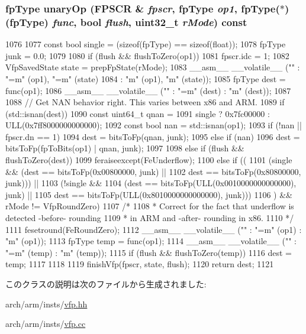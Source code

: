 \hypertarget{classArmISA_1_1FpOp_a0129111f707a89446f721aafe6b11748}{
\subsubsection[{unaryOp}]{\setlength{\rightskip}{0pt plus 5cm}fpType unaryOp (FPSCR \& {\em fpscr}, \/  fpType {\em op1}, \/  fpType($\ast$)(fpType) {\em func}, \/  bool {\em flush}, \/  {\bf uint32\_\-t} {\em rMode}) const}}
\label{classArmISA_1_1FpOp_a0129111f707a89446f721aafe6b11748}



\begin{DoxyCode}
1076 {
1077     const bool single = (sizeof(fpType) == sizeof(float));
1078     fpType junk = 0.0;
1079 
1080     if (flush && flushToZero(op1))
1081         fpscr.idc = 1;
1082     VfpSavedState state = prepFpState(rMode);
1083     __asm__ __volatile__ ("" : "=m" (op1), "=m" (state)
1084                              : "m" (op1), "m" (state));
1085     fpType dest = func(op1);
1086     __asm__ __volatile__ ("" : "=m" (dest) : "m" (dest));
1087 
1088     // Get NAN behavior right. This varies between x86 and ARM.
1089     if (std::isnan(dest)) {
1090         const uint64_t qnan =
1091             single ? 0x7fc00000 : ULL(0x7ff8000000000000);
1092         const bool nan = std::isnan(op1);
1093         if (!nan || fpscr.dn == 1) {
1094             dest = bitsToFp(qnan, junk);
1095         } else if (nan) {
1096             dest = bitsToFp(fpToBits(op1) | qnan, junk);
1097         }
1098     } else if (flush && flushToZero(dest)) {
1099         feraiseexcept(FeUnderflow);
1100     } else if ((
1101                 (single && (dest == bitsToFp(0x00800000, junk) ||
1102                      dest == bitsToFp(0x80800000, junk))) ||
1103                 (!single &&
1104                     (dest == bitsToFp(ULL(0x0010000000000000), junk) ||
1105                      dest == bitsToFp(ULL(0x8010000000000000), junk)))
1106                ) && rMode != VfpRoundZero) {
1107         /*
1108          * Correct for the fact that underflow is detected -before- rounding
1109          * in ARM and -after- rounding in x86.
1110          */
1111         fesetround(FeRoundZero);
1112         __asm__ __volatile__ ("" : "=m" (op1) : "m" (op1));
1113         fpType temp = func(op1);
1114         __asm__ __volatile__ ("" : "=m" (temp) : "m" (temp));
1115         if (flush && flushToZero(temp)) {
1116             dest = temp;
1117         }
1118     }
1119     finishVfp(fpscr, state, flush);
1120     return dest;
1121 }
\end{DoxyCode}


このクラスの説明は次のファイルから生成されました:\begin{DoxyCompactItemize}
\item 
arch/arm/insts/\hyperlink{vfp_8hh}{vfp.hh}\item 
arch/arm/insts/\hyperlink{vfp_8cc}{vfp.cc}\end{DoxyCompactItemize}

